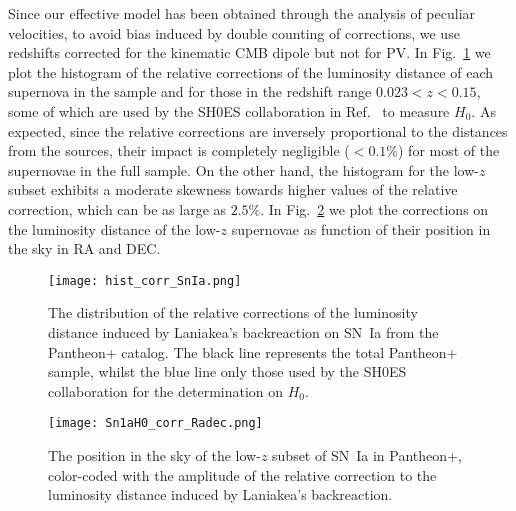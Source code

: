 \documentclass[notitlepage,nofootinbib]{revtex4-1}
\begin{document}
Since our effective model has been obtained through the analysis of peculiar velocities, to avoid bias induced by double counting of corrections, we use redshifts corrected for the kinematic CMB dipole but not for PV. In Fig.~\ref{Pantheon+_corr} we plot the histogram of the relative corrections of the luminosity distance of each supernova in the sample and for those in the redshift range $0.023 < z < 0.15$, some of which are used by the SH0ES collaboration in Ref.~\cite{Riess:2021jrx} to measure $H_0$. As expected, since the relative corrections are inversely proportional to the distances from the sources, their impact is completely negligible ($<0.1\% $) for most of the supernovae in the full sample. On the other hand, the histogram for the low-$z$ subset exhibits a moderate skewness towards higher values of the relative correction, which can be as large as $2.5 \%$.
In Fig.~\ref{P+lowzcorr-radec} we plot the corrections on the luminosity distance of  the low-$z$ supernovae as function of their position in the sky in RA and DEC.

\begin{figure}[h]
    \centering
	\texttt{[image: hist\_corr\_SnIa.png]}\\
	\caption{The distribution of the relative corrections of the luminosity distance induced by Laniakea's backreaction on SN~Ia from the Pantheon+ catalog. The black line represents the total Pantheon+ sample, whilst the blue line only those used by the SH0ES collaboration for the determination on $H_0$.}\label{Pantheon+_corr}
\end{figure}

\begin{figure}[]
    \centering
    \texttt{[image: Sn1aH0\_corr\_Radec.png]}\\
	\caption{The position in the sky of the low-$z$ subset of SN~Ia in Pantheon+, color-coded with the amplitude of the relative correction to the luminosity distance induced  by Laniakea's backreaction.}\label{P+lowzcorr-radec}
\end{figure}
\end{document}
